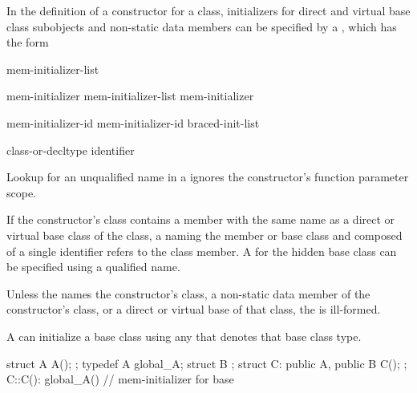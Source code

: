 \pnum
In the definition of a constructor for a class,
initializers for direct and virtual base class subobjects and
non-static data members can be specified by a
,
which has the form
\begin{bnf}
\br
    \terminal{:} mem-initializer-list
\end{bnf}

\begin{bnf}
\br
    mem-initializer \br
    mem-initializer-list \terminal{,} mem-initializer 
\end{bnf}

\begin{bnf}
\br
    mem-initializer-id \terminal{(}  \terminal{)}\br
    mem-initializer-id braced-init-list
\end{bnf}

\begin{bnf}
\br
    class-or-decltype\br
    identifier
\end{bnf}

\pnum
Lookup for an unqualified name in a 
ignores the constructor's function parameter scope.
\begin{note}
If the constructor's class contains a member with the same name as a direct
or virtual base class of the class, a
naming the member or base class and composed of a single identifier
refers to the class member.
A
for the hidden base class can be specified using a qualified name.
\end{note}
Unless the
names the constructor's class,
a non-static data member of the constructor's class, or
a direct or virtual base of that class,
the
is ill-formed.

\pnum
A
can initialize a base class using any  that denotes that base class type.
\begin{example}
\begin{codeblock}
struct A { A(); };
typedef A global_A;
struct B { };
struct C: public A, public B { C(); };
C::C(): global_A() { }          // mem-initializer for base 
\end{codeblock}
\end{example}

